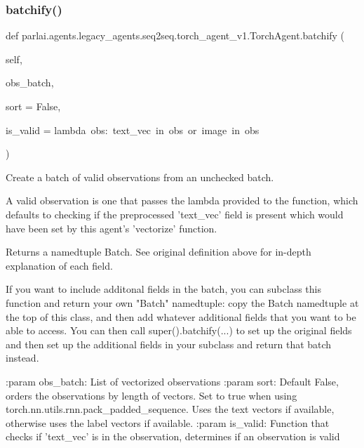 \mbox{\label{classparlai_1_1agents_1_1legacy__agents_1_1seq2seq_1_1torch__agent__v1_1_1TorchAgent_ab8b2fa26aabfd9d7e7abb0abbcfe8044}} 
\subsubsection{\texorpdfstring{batchify()}{batchify()}}
{\footnotesize\ttfamily def parlai.\+agents.\+legacy\+\_\+agents.\+seq2seq.\+torch\+\_\+agent\+\_\+v1.\+Torch\+Agent.\+batchify (\begin{DoxyParamCaption}\item[{}]{self,  }\item[{}]{obs\+\_\+batch,  }\item[{}]{sort = {\ttfamily False},  }\item[{}]{is\+\_\+valid = {\ttfamily lambda~obs\+:~\textquotesingle{}text\+\_\+vec\textquotesingle{}~in~obs~or~\textquotesingle{}image\textquotesingle{}~in~obs} }\end{DoxyParamCaption})}

\begin{DoxyVerb}Create a batch of valid observations from an unchecked batch.

A valid observation is one that passes the lambda provided to the
function, which defaults to checking if the preprocessed 'text_vec'
field is present which would have been set by this agent's 'vectorize'
function.

Returns a namedtuple Batch. See original definition above for in-depth
explanation of each field.

If you want to include additonal fields in the batch, you can subclass
this function and return your own "Batch" namedtuple: copy the Batch
namedtuple at the top of this class, and then add whatever additional
fields that you want to be able to access. You can then call
super().batchify(...) to set up the original fields and then set up the
additional fields in your subclass and return that batch instead.

:param obs_batch: List of vectorized observations
:param sort:      Default False, orders the observations by length of
          vectors. Set to true when using
          torch.nn.utils.rnn.pack_padded_sequence.
          Uses the text vectors if available, otherwise uses
          the label vectors if available.
:param is_valid:  Function that checks if 'text_vec' is in the
          observation, determines if an observation is valid
\end{DoxyVerb}
 


